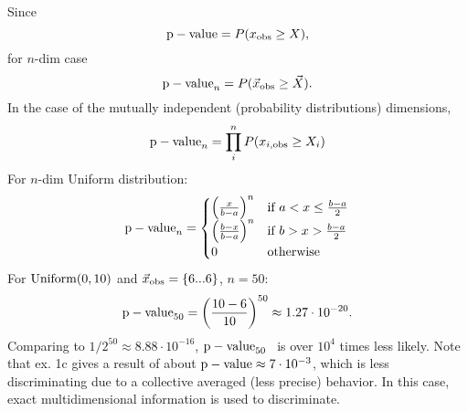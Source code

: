 \documentclass[a4paper]{article}
\begin{document}


Since
% 
\begin{equation}
    {\rm p-value} = P(x_{\rm obs} \ge X),
\end{equation}
for $n$-dim case 
\begin{equation}
    {\rm p-value}_n = P(\vec{x}_{\rm obs} \ge \vec{X}).
\end{equation}
% 
In the case of the 
mutually independent (probability distributions) dimensions,
% 
\begin{equation}
    {\rm p-value}_n = \prod_i^n P(x_{i,\rm obs} \ge X_i)
\end{equation}
% 
For $n$-dim Uniform distribution:
% 
\begin{equation}
  {\rm p-value}_n =
    \begin{cases}
      \left(\frac{x}{b - a} \right)^n & \text{if } a < x \le \frac{b - a}{2}\\
      \left(\frac{b - x}{b - a} \right)^n & \text{if } b > x > \frac{b - a}{2} \\
      0 & \text{otherwise}
    \end{cases}
\end{equation}
% 
For ${\rm Uniform}(0, 10)$ and $\vec{x}_{\rm obs} = \{6...6\}$, $n = 50$:
\begin{equation}
    {\rm p-value}_{50} = \left(\frac{10 - 6}{10} \right)^{50} \approx 1.27 \cdot 
10^{-20}.
\end{equation}
% 
Comparing to $1/2^{50} \approx 8.88 \cdot 10^{-16}$, ${\rm p-value}_{50}$ \
is over $10^4$ times less likely. Note that ex. 1c gives a result of about
${\rm p-value} \approx 7 \cdot 10^{-3}$, which is less discriminating due to 
a collective averaged (less precise) behavior. In this case, exact 
multidimensional information is used to discriminate.
\end{document}
